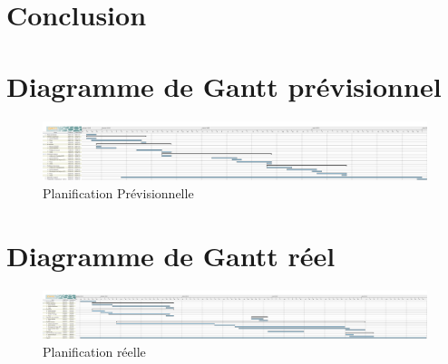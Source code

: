 \documentclass{report}
\begin{document}
\chapter{Conclusion}



\appendix
\chapter{Diagramme de Gantt prévisionnel}
	\begin{figure}
		 \hspace{-4cm} 
			\includegraphics[scale=0.3]{../DiagrammePrevisionnel.png}
			\caption[Planification Prévisionnelle]{Planification Prévisionnelle}
	\end{figure}
	\medskip


\chapter{Diagramme de Gantt réel}
	\begin{figure}
		 \hspace{-4cm} 
			\includegraphics[scale=0.3]{../DiagrammeReel.png}
			\caption[Planification réelle]{Planification réelle}
	\end{figure}
	\medskip
\end{document}
